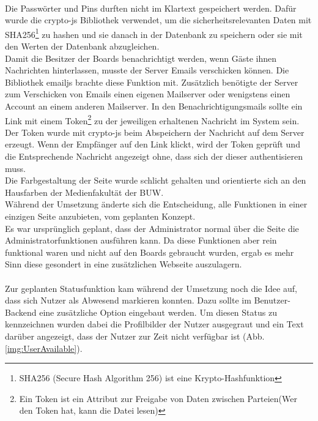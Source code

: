 \\
Die Passwörter und Pins durften nicht im Klartext gespeichert werden.
Dafür wurde die crypto-js\cite{cryptojs:website} Bibliothek verwendet, um die sicherheitsrelevanten Daten mit SHA256\footnote{SHA256 (Secure Hash Algorithm 256) ist eine Krypto-Hashfunktion} zu hashen und sie danach in der Datenbank zu speichern oder sie mit den Werten der Datenbank abzugleichen.
\\
Damit die Besitzer der Boards benachrichtigt werden, wenn Gäste ihnen Nachrichten hinterlassen, musste der Server Emails verschicken können.
Die Bibliothek emailjs\cite{emailjs:website} brachte diese Funktion mit. Zusätzlich benötigte der Server zum Verschicken von Emails einen eigenen Mailserver oder wenigstens einen Account an einem anderen Mailserver.
In den Benachrichtigungsmails sollte ein Link mit einem Token\footnote{Ein Token ist ein Attribut zur Freigabe von Daten zwischen Parteien(Wer den Token hat, kann die Datei lesen)} zu der jeweiligen erhaltenen Nachricht im System sein. Der Token wurde mit crypto-js beim Abspeichern der Nachricht auf dem Server erzeugt. Wenn der Empfänger auf den Link klickt, wird der Token geprüft und die Entsprechende Nachricht angezeigt ohne, dass sich der dieser authentisieren muss.
\\
Die Farbgestaltung der Seite wurde schlicht gehalten und orientierte sich an den Hausfarben der Medienfakultät der BUW.
\\
Während der Umsetzung änderte sich die Entscheidung, alle Funktionen in einer einzigen Seite anzubieten, vom geplanten Konzept.
\\
Es war ursprünglich geplant, dass der Administrator normal über die Seite die Administratorfunktionen ausführen kann. Da diese Funktionen aber rein funktional waren und nicht auf den Boards gebraucht wurden, ergab es mehr Sinn diese gesondert in eine zusätzlichen Webseite auszulagern.
\\
\\
Zur geplanten Statusfunktion kam während der Umsetzung noch die Idee auf, dass sich Nutzer als Abwesend markieren konnten. Dazu sollte im Benutzer-Backend eine zusätzliche Option eingebaut werden. Um diesen Status zu kennzeichnen wurden dabei die Profilbilder der Nutzer ausgegraut und ein Text darüber angezeigt, dass der Nutzer zur Zeit nicht verfügbar ist (Abb. \ref{img:UserAvailable}).

